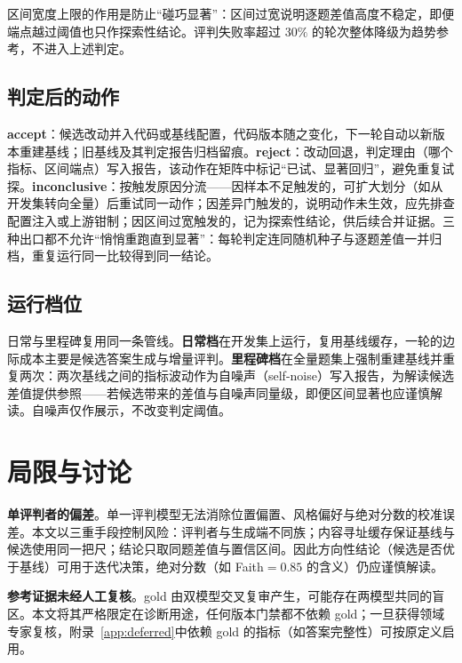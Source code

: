\documentclass[11pt,a4paper,fontset=fandol]{ctexart}
\begin{document}
区间宽度上限的作用是防止``碰巧显著''：区间过宽说明逐题差值高度不稳定，即便端点越过阈值也只作探索性结论。评判失败率超过 $30\%$ 的轮次整体降级为趋势参考，不进入上述判定。

\subsection{判定后的动作}
\label{sec:after}

\textbf{accept}：候选改动并入代码或基线配置，代码版本随之变化，下一轮自动以新版本重建基线；旧基线及其判定报告归档留痕。\textbf{reject}：改动回退，判定理由（哪个指标、区间端点）写入报告，该动作在矩阵中标记``已试、显著回归''，避免重复试探。\textbf{inconclusive}：按触发原因分流——因样本不足触发的，可扩大划分（如从开发集转向全量）后重试同一动作；因差异门触发的，说明动作未生效，应先排查配置注入或上游钳制；因区间过宽触发的，记为探索性结论，供后续合并证据。三种出口都不允许``悄悄重跑直到显著''：每轮判定连同随机种子与逐题差值一并归档，重复运行同一比较得到同一结论。

\subsection{运行档位}

日常与里程碑复用同一条管线。\textbf{日常档}在开发集上运行，复用基线缓存，一轮的边际成本主要是候选答案生成与增量评判。\textbf{里程碑档}在全量题集上强制重建基线并重复两次：两次基线之间的指标波动作为自噪声（self-noise）写入报告，为解读候选差值提供参照——若候选带来的差值与自噪声同量级，即便区间显著也应谨慎解读。自噪声仅作展示，不改变判定阈值。

\section{局限与讨论}
\label{sec:limitations}

\textbf{单评判者的偏差}。单一评判模型无法消除位置偏置、风格偏好与绝对分数的校准误差\cite{zheng2023judge,ye2024justice}。本文以三重手段控制风险：评判者与生成端不同族；内容寻址缓存保证基线与候选使用同一把尺；结论只取同题差值与置信区间。因此方向性结论（候选是否优于基线）可用于迭代决策，绝对分数（如 Faith$=0.85$ 的含义）仍应谨慎解读。

\textbf{参考证据未经人工复核}。gold 由双模型交叉复审产生，可能存在两模型共同的盲区。本文将其严格限定在诊断用途，任何版本门禁都不依赖 gold；一旦获得领域专家复核，附录~\ref{app:deferred}中依赖 gold 的指标（如答案完整性）可按原定义启用。
\end{document}
